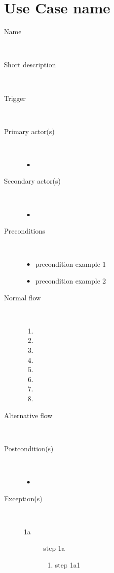 \section{Use Case name}

\begin{description}
	\item[Name] \
		\par
	\item[Short description] \ 
			\par
	\item[Trigger] \ 
			\par
	\item[Primary actor(s)] \ 
		\begin{itemize}
		  \item 
		\end{itemize}
	\item[Secondary actor(s)] \ 
		\begin{itemize}
		  \item 
		\end{itemize} 
	\item[Preconditions] \ 
	\begin{itemize}
		\item precondition example 1
		\item precondition example 2
	\end{itemize}
	\item[Normal flow] \ 
	\begin{enumerate}
	  	\item 
	  	\item 
	  	\item 
	  	\item 
	  	\item 
	  	\item 
	  	\item 
	  	\item
	\end{enumerate}
	\item[Alternative flow] \
		\par
	\item[Postcondition(s)] \ 
	\begin{itemize}
		\item 
	\end{itemize}
	\item[Exception(s)] \ 
	\begin{description}
		\item[1a] step 1a
		\begin{enumerate}
		  \item step 1a1
		\end{enumerate}
	\end{description}
\end{description}